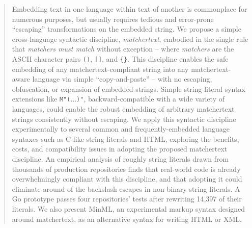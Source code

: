 \begin{abstract}
Embedding text in one language within text of another is commonplace
for numerous purposes,
but usually requires tedious and error-prone
``escaping'' transformations on the embedded string.
We propose a simple cross-language syntactic discipline,
\emph{matchertext},
embodied in the single rule that \emph{matchers must match}
without exception --
where \emph{matchers} are the ASCII character pairs
\texttt{()}, \texttt{[]}, and \texttt{\{\}}.
This discipline
enables the safe embedding of any matchertext-compliant string
into any matchertext-aware language via simple ``copy-and-paste'' --
with no escaping, obfuscation, or expansion of embedded strings.
Simple string-literal syntax extensions like \texttt{M"(}$\dots$\texttt{)"},
backward-compatible with a wide variety of languages,
could enable the robust embedding of arbitrary matchertext strings
consistently without escaping.
We apply this syntactic discipline experimentally
to several common and frequently-embedded
language syntaxes such as C-like string literals and HTML,
exploring the benefits, costs, and compatibility issues
in adopting the proposed matchertext discipline.
An empirical analysis of roughly \dataStrSamplesRound string literals
drawn from thousands of production repositories
finds that real-world code is already overwhelmingly compliant
with this discipline,
and that adopting it could eliminate
around \dataReductionRound of the backslash escapes in non-binary string literals.
A Go prototype passes four repositories' tests after rewriting 14{,}397 of their literals.
We also present MinML,
an experimental markup syntax designed around matchertext,
as an alternative syntax for writing HTML or XML.
\end{abstract}
